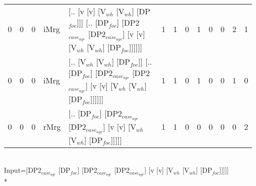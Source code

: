 \begin{tabularx}{\linewidth}{rrrlXrrrrrrrr}
   0 &       0 &   0 & iMrg & [.. [v [v] [V$_{wh}$ [V$_{wh}$] [DP$_{foc}$]]] [.. [DP$_{foc}$] [DP2$_{case_{agr}}$ [DP2$_{case_{agr}}$] [v [v] [V$_{wh}$ [V$_{wh}$] [DP$_{foc}$]]]]]]                               &             1 &             1 &                  0 &            1 &                0 &             0 &          2 &        1 \\
   0 &       0 &   0 & iMrg & [.. [V$_{wh}$ [V$_{wh}$] [DP$_{foc}$]] [.. [DP$_{foc}$] [DP2$_{case_{agr}}$ [DP2$_{case_{agr}}$] [v [v] [V$_{wh}$ [V$_{wh}$] [DP$_{foc}$]]]]]]                                       &             1 &             1 &                  0 &            1 &                0 &             0 &          1 &        0 \\
   0 &       0 &   0 & rMrg & [.. [DP$_{foc}$] [DP2$_{case_{agr}}$ [DP2$_{case_{agr}}$] [v [v] [V$_{wh}$ [V$_{wh}$] [DP$_{foc}$]]]]]                                                                   &             1 &             1 &                  0 &            0 &                0 &             0 &          0 &        2 \\
\hline
\end{tabularx}\endgroup\\
\begingroup\scriptsize Input=[DP2$_{case_{agr}}$ [DP$_{foc}$] [DP2$_{case_{agr}}$ [DP2$_{case_{agr}}$] [v [v] [V$_{wh}$ [V$_{wh}$] [DP$_{foc}$]]]]]\\*

